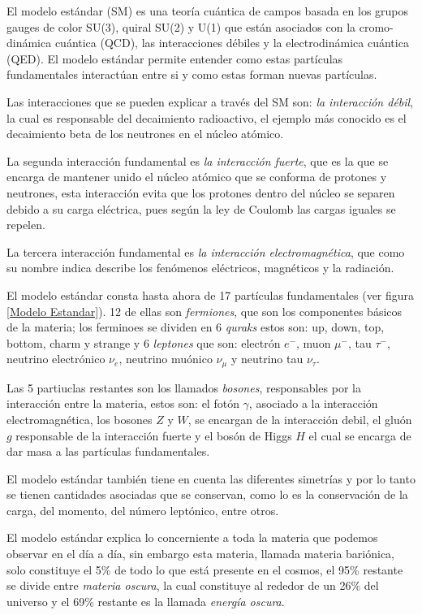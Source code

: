 \documentclass[journal]{IEEEtran}
\begin{document}
El modelo estándar (SM) es una teoría cuántica de campos basada en los grupos gauges de color SU(3), quiral SU(2) y U(1) que están asociados con la cromo-dinámica cuántica (QCD), las interacciones débiles y la electrodinámica cuántica (QED).\hspace{.2cm}\cite{S.D. Bass} El modelo estándar permite entender como estas partículas fundamentales interactúan entre si y como estas forman nuevas partículas.

Las interacciones que se pueden explicar a través del SM son: \emph{la interacción débil}, la cual es responsable del decaimiento radioactivo, el ejemplo más conocido es el decaimiento beta de los neutrones en el núcleo atómico.

La segunda interacción fundamental es \emph{la interacción fuerte}, que es la que se encarga de mantener unido el núcleo atómico que se conforma de protones y neutrones, esta interacción evita que los protones dentro del núcleo se separen debido a su carga eléctrica, pues según la ley de Coulomb las cargas iguales se repelen.

La tercera interacción fundamental es \emph{la interacción electromagnética}, que como su nombre indica describe los fenómenos eléctricos, magnéticos y la radiación.  

El modelo estándar consta hasta ahora de 17 partículas fundamentales (ver figura \ref{Modelo Estandar}). 12 de ellas son \emph{fermiones}, que son los componentes básicos de la materia; los ferminoes se dividen en 6 \emph{quraks} estos son: up, down, top, bottom, charm y strange y  6 \emph{leptones} que son: electrón $e^{-}$, muon $\mu^{-}$, tau $\tau^{-}$, neutrino electrónico $\nu_{e}$, neutrino muónico $\nu_{\mu}$ y neutrino tau $\nu_{\tau}$.

Las 5 partiuclas restantes son los llamados \emph{bosones}, responsables por la interacción entre la  materia, estos son: el fotón $\gamma$, asociado a la interacción electromagnética, los bosones $Z$ y $W$, se encargan de la interacción debil, el gluón $g$ responsable de la interacción fuerte y el bosón de Higgs $H$ el cual se encarga de dar masa a las partículas fundamentales.

El modelo estándar también tiene en cuenta las diferentes simetrías y por lo tanto se tienen cantidades asociadas que se conservan, como lo es la conservación de la carga, del momento, del número leptónico, entre otros.

El modelo estándar explica lo concerniente a toda la materia que podemos observar en el día a día, sin embargo esta materia, llamada materia bariónica, solo constituye el 5\% de todo lo que está presente en el cosmos, el 95\% restante se divide entre \emph{materia oscura}, la cual constituye al rededor de un 26\% del universo y el 69\% restante es la llamada \emph{energía oscura}.
\end{document}
